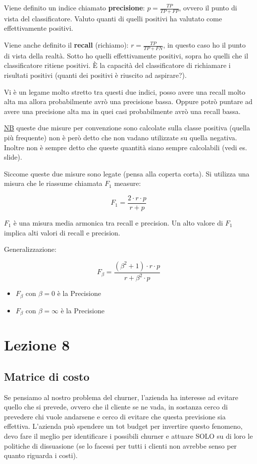 Viene definito un indice chiamato \textbf{precisione}: $p = \frac{TP}{TP+FP}$, ovvero il punto di vista del classificatore. Valuto quanti di quelli positivi ha valutato come effettivamente positivi. 

Viene anche definito il \textbf{recall} (richiamo): $r = \frac{TP}{TP+FN}$, in questo caso ho il punto di vista della realt\`a. Sotto ho quelli effettivamente positivi, sopra ho quelli che il classificatore ritiene positivi. \`E la capacit\`a del classificatore di richiamare i risultati positivi (quanti dei positivi \`e riuscito ad aspirare?). 

Vi \`e un legame molto stretto tra questi due indici, posso avere una recall molto alta ma allora probabilmente avrò una precisione bassa. Oppure potrò puntare ad avere una precisione alta ma in quei casi probabilmente avrò una recall bassa.

\underline{NB} queste due misure per convenzione sono calcolate sulla classe positiva (quella pi\`u frequente) non \`e per\`o detto che non vadano utilizzate su quella negativa. Inoltre non \`e sempre detto che queste quantit\`a siano sempre calcolabili (vedi es. slide).

Siccome queste due misure sono legate (pensa alla coperta corta). Si utilizza una misura che le riassume chiamata $F_1$ measure:

\[ F_1 = \frac{2 \cdot r \cdot p}{r + p}\]

$F_1$ \`e una misura media armonica tra recall e precision. Un alto valore di $F_1$ implica alti valori di recall e precision.

Generalizzazione:

\[ F_\beta = \frac{(\beta^2 + 1) \cdot r \cdot p}{r + \beta^2 \cdot p} \]

\begin{itemize}
	\item $F_\beta$ con $\beta = 0$ \`e la Precisione
	\item $F_\beta$ con $\beta = \infty$ \`e la Precisione	
\end{itemize}

\section{Lezione 8}

\subsection{Matrice di costo}
Se pensiamo al nostro problema del churner, l'azienda ha interesse ad evitare quello che si prevede, ovvero che il cliente se ne vada, in sostanza cerco di prevedere chi vuole andarsene e cerco di evitare che questa previsione sia effettiva. L'azienda pu\`o spendere un tot budget per invertire questo fenomeno, devo fare il meglio per identificare i possibili churner e attuare SOLO su di loro le politiche di dissuasione (se lo facessi per tutti i clienti non avrebbe senso per quanto riguarda i costi).

